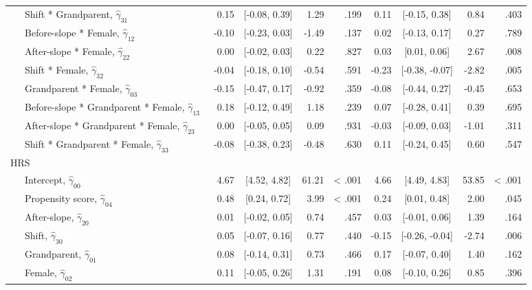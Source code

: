 \documentclass[
  english,
  man, noextraspace]{apa7}
\newenvironment{lltable}{\begin{landscape}\begin{center}\begin{ThreePartTable}}{\end{ThreePartTable}\end{center}\end{landscape}}
\begin{document}
\begin{appendix}
\begin{lltable}
{\begin{longtable}{lrcrrrcrr}
\ \ \ Shift * Grandparent, $\hat{\gamma}_{31}$ \textcolor{white}{L} & 0.15 & [-0.08, 0.39] & 1.29 & .199 & 0.11 & [-0.15, 0.38] & 0.84 & .403\\
\ \ \ Before-slope * Female, $\hat{\gamma}_{12}$ & -0.10 & [-0.23, 0.03] & -1.49 & .137 & 0.02 & [-0.13, 0.17] & 0.27 & .789\\
\ \ \ After-slope * Female, $\hat{\gamma}_{22}$ \textcolor{white}{L} & 0.00 & [-0.02, 0.03] & 0.22 & .827 & 0.03 & [0.01, 0.06] & 2.67 & .008\\
\ \ \ Shift * Female, $\hat{\gamma}_{32}$ \textcolor{white}{L} & -0.04 & [-0.18, 0.10] & -0.54 & .591 & -0.23 & [-0.38, -0.07] & -2.82 & .005\\
\ \ \ Grandparent * Female, $\hat{\gamma}_{03}$ \textcolor{white}{L} & -0.15 & [-0.47, 0.17] & -0.92 & .359 & -0.08 & [-0.44, 0.27] & -0.45 & .653\\
\ \ \ Before-slope * Grandparent * Female, $\hat{\gamma}_{13}$ & 0.18 & [-0.12, 0.49] & 1.18 & .239 & 0.07 & [-0.28, 0.41] & 0.39 & .695\\
\ \ \ After-slope * Grandparent * Female, $\hat{\gamma}_{23}$ \textcolor{white}{L} & 0.00 & [-0.05, 0.05] & 0.09 & .931 & -0.03 & [-0.09, 0.03] & -1.01 & .311\\
\ \ \ Shift * Grandparent * Female, $\hat{\gamma}_{33}$ \textcolor{white}{L} & -0.08 & [-0.38, 0.23] & -0.48 & .630 & 0.11 & [-0.24, 0.45] & 0.60 & .547\\
HRS &  &  &  &  &  &  &  & \\
\ \ \ Intercept, $\hat{\gamma}_{00}$ \textcolor{white}{H} & 4.67 & [4.52, 4.82] & 61.21 & < .001 & 4.66 & [4.49, 4.83] & 53.85 & < .001\\
\ \ \ Propensity score, $\hat{\gamma}_{04}$ \textcolor{white}{H} & 0.48 & [0.24, 0.72] & 3.99 & < .001 & 0.24 & [0.01, 0.48] & 2.00 & .045\\
\ \ \ After-slope, $\hat{\gamma}_{20}$ \textcolor{white}{H} & 0.01 & [-0.02, 0.05] & 0.74 & .457 & 0.03 & [-0.01, 0.06] & 1.39 & .164\\
\ \ \ Shift, $\hat{\gamma}_{30}$ \textcolor{white}{H} & 0.05 & [-0.07, 0.16] & 0.77 & .440 & -0.15 & [-0.26, -0.04] & -2.74 & .006\\
\ \ \ Grandparent, $\hat{\gamma}_{01}$ \textcolor{white}{H} & 0.08 & [-0.14, 0.31] & 0.73 & .466 & 0.17 & [-0.07, 0.40] & 1.40 & .162\\
\ \ \ Female, $\hat{\gamma}_{02}$ \textcolor{white}{H} & 0.11 & [-0.05, 0.26] & 1.31 & .191 & 0.08 & [-0.10, 0.26] & 0.85 & .396\\

\end{longtable}}
\end{lltable}
\end{appendix}
\end{document}
